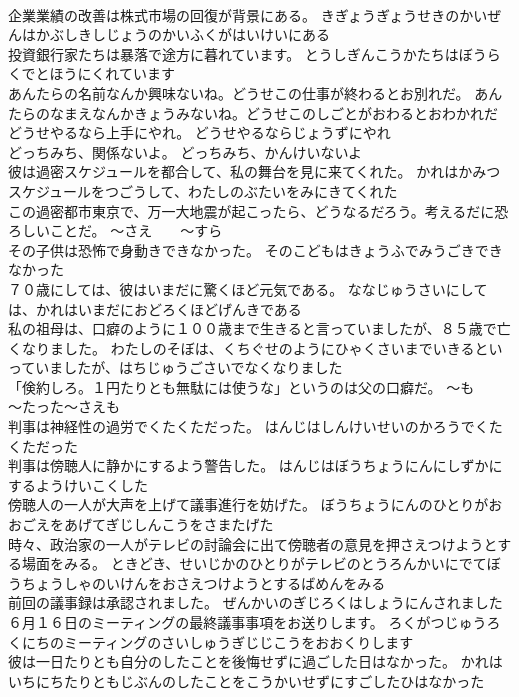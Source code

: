 \documentclass[8pt]{extreport}
\begin{document}
\begin{CJK}{UTF8}{min}
\\	企業業績の改善は株式市場の回復が背景にある。	きぎょうぎょうせきのかいぜんはかぶしきしじょうのかいふくがはいけいにある 
\\	投資銀行家たちは暴落で途方に暮れています。	とうしぎんこうかたちはぼうらくでとほうにくれています 
\\	あんたらの名前なんか興味ないね。どうせこの仕事が終わるとお別れだ。	あんたらのなまえなんかきょうみないね。どうせこのしごとがおわるとおわかれだ 
\\	どうせやるなら上手にやれ。	どうせやるならじょうずにやれ 
\\	どっちみち、関係ないよ。	どっちみち、かんけいないよ 
\\	彼は過密スケジュールを都合して、私の舞台を見に来てくれた。	かれはかみつスケジュールをつごうして、わたしのぶたいをみにきてくれた 
\\	この過密都市東京で、万一大地震が起こったら、どうなるだろう。考えるだに恐ろしいことだ。	～さえ　　～すら
\\	その子供は恐怖で身動きできなかった。	そのこどもはきょうふでみうごきできなかった 
\\	７０歳にしては、彼はいまだに驚くほど元気である。	ななじゅうさいにしては、かれはいまだにおどろくほどげんきである 
\\	私の祖母は、口癖のように１００歳まで生きると言っていましたが、８５歳で亡くなりました。	わたしのそぼは、くちぐせのようにひゃくさいまでいきるといっていましたが、はちじゅうごさいでなくなりました 
\\	「倹約しろ。１円たりとも無駄には使うな」というのは父の口癖だ。	～も　　～たった～さえも
\\	判事は神経性の過労でくたくただった。	はんじはしんけいせいのかろうでくたくただった 
\\	判事は傍聴人に静かにするよう警告した。	はんじはぼうちょうにんにしずかにするようけいこくした 
\\	傍聴人の一人が大声を上げて議事進行を妨げた。	ぼうちょうにんのひとりがおおごえをあげてぎじしんこうをさまたげた 
\\	時々、政治家の一人がテレビの討論会に出て傍聴者の意見を押さえつけようとする場面をみる。	ときどき、せいじかのひとりがテレビのとうろんかいにでてぼうちょうしゃのいけんをおさえつけようとするばめんをみる 
\\	前回の議事録は承認されました。	ぜんかいのぎじろくはしょうにんされました 
\\	６月１６日のミーティングの最終議事事項をお送りします。	ろくがつじゅうろくにちのミーティングのさいしゅうぎじじこうをおおくりします 
\\	彼は一日たりとも自分のしたことを後悔せずに過ごした日はなかった。	かれはいちにちたりともじぶんのしたことをこうかいせずにすごしたひはなかった 

\end{CJK}
\end{document}
